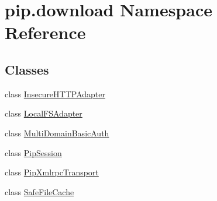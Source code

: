 \hypertarget{namespacepip_1_1download}{}\section{pip.\+download Namespace Reference}
\label{namespacepip_1_1download}
\subsection*{Classes}
\begin{DoxyCompactItemize}
\item 
class \hyperlink{classpip_1_1download_1_1_insecure_h_t_t_p_adapter}{Insecure\+H\+T\+T\+P\+Adapter}
\item 
class \hyperlink{classpip_1_1download_1_1_local_f_s_adapter}{Local\+F\+S\+Adapter}
\item 
class \hyperlink{classpip_1_1download_1_1_multi_domain_basic_auth}{Multi\+Domain\+Basic\+Auth}
\item 
class \hyperlink{classpip_1_1download_1_1_pip_session}{Pip\+Session}
\item 
class \hyperlink{classpip_1_1download_1_1_pip_xmlrpc_transport}{Pip\+Xmlrpc\+Transport}
\item 
class \hyperlink{classpip_1_1download_1_1_safe_file_cache}{Safe\+File\+Cache}
\end{DoxyCompactItemize}
